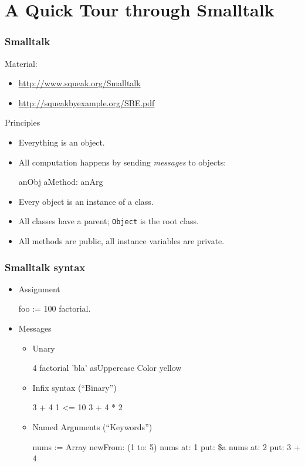 \section{A Quick Tour through Smalltalk}

\begin{frame}[fragile]
\frametitle{Smalltalk}
Material:
\begin{itemize}
  \item \url{http://www.squeak.org/Smalltalk}
  \item \url{http://squeakbyexample.org/SBE.pdf}
\end{itemize}

Principles
\begin{itemize}
\item Everything is an object.
\item All computation happens by sending \textit{messages} to objects:
\begin{cplus3}
      anObj aMethod: anArg
\end{cplus3}
\item Every object is an instance of a class.
\item All classes have a parent; \texttt{Object} is the root class.
\item All methods are public, all instance variables are private.
\end{itemize}


\end{frame}

\begin{frame}[fragile]
\frametitle{Smalltalk syntax}
\begin{itemize}
\item Assignment
\begin{cplus3}
foo := 100 factorial.
\end{cplus3}

\item Messages
\begin{itemize}
\item Unary
\begin{cplus3}
4 factorial
'bla' asUppercase
Color yellow
\end{cplus3}

\item Infix syntax (``Binary'')
\begin{cplus3}
3 + 4
1 <= 10
3 + 4 * 2
\end{cplus3}

\item Named Arguments (``Keywords'')
\begin{cplus3}
nums := Array newFrom: (1 to: 5)
nums at: 1 put: \$a
nums at: 2 put: 3 + 4
\end{cplus3}
\end{itemize}
\end{itemize}
\end{frame}

